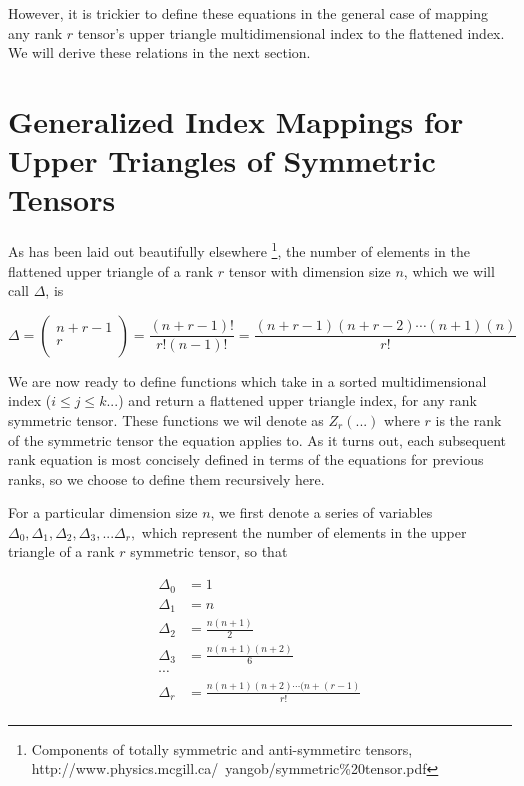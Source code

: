 \documentclass{article}
\begin{document}
However, it is trickier to define these equations in the general case of mapping any rank $r$ tensor's upper triangle multidimensional index to the flattened index.
We will derive these relations in the next section.

\section{Generalized Index Mappings for Upper Triangles of Symmetric Tensors}
As has been laid out beautifully elsewhere \footnote{Components of totally symmetric and anti-symmetirc tensors, http://www.physics.mcgill.ca/~yangob/symmetric\%20tensor.pdf},
the number of elements in the flattened upper triangle of a rank $r$ tensor with dimension size $n$, which we will call $\Delta$, is 

\begin{equation*}
\Delta = 
\begin{pmatrix}
n + r - 1 \\
r \\
\end{pmatrix}
= \frac{(n + r - 1)!}{r!(n-1)!} = \frac{(n + r - 1)(n + r - 2) \cdots (n + 1) (n)}{r!}
\end{equation*}

We are now ready to define functions which take in a sorted multidimensional index ($i \leq j \leq k ...$) and return a flattened upper triangle index, for any rank symmetric tensor.
These functions we wil denote as $Z_r(...)$ where $r$ is the rank of the symmetric tensor the equation applies to.
As it turns out, each subsequent rank equation is most concisely defined in terms of the equations for previous ranks, so we choose to define them recursively here.

For a particular dimension size $n$, we first denote a series of variables $\Delta_0,\Delta_1,\Delta_2, \Delta_3, ... \Delta_r, $ which represent the number of elements 
in the upper triangle of a rank $r$ symmetric tensor, so that

\begin{align*}
\Delta_0 &= 1 \\
\Delta_1 &= n \\
\Delta_2 &= \frac{n(n+1)}{2} \\
\Delta_3 &= \frac{n(n+1)(n+2)}{6} \\
\cdots   & \\
\Delta_r &= \frac{n(n+1)(n+2)\cdots (n + (r-1)}{r!} \\
\end{align*}
\end{document}
